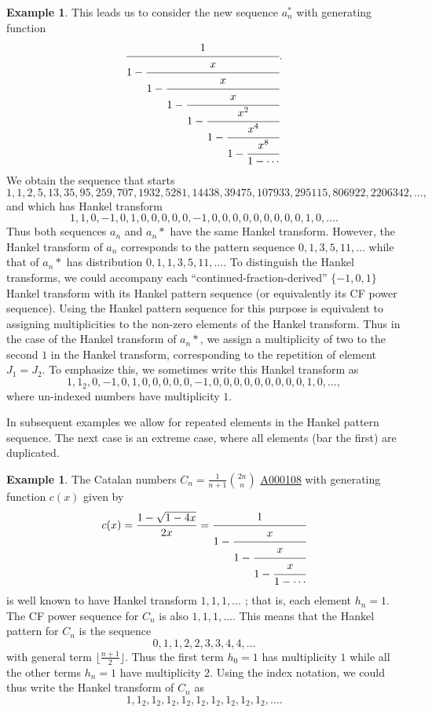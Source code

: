\documentclass[12pt,reqno]{article}
\theoremstyle{definition}
\newtheorem{example}[theorem]{Example}
\newcommand{\seqnum}[1]{\href{http://oeis.org/#1}{\underline{#1}}}
\begin{document}
\begin{example}
This leads us to consider the new sequence $a_n^*$ with generating function
$$\cfrac{1}{1-
\cfrac{x}{1-
\cfrac{x}{1-
\cfrac{x}{1-
\cfrac{x^2}{1-
\cfrac{x^4}{1-
\cfrac{x^8}{1-\cdots}}}}}}}.$$ We obtain the sequence that starts
$$1, 1, 2, 5, 13, 35, 95, 259, 707, 1932, 5281, 14438, 39475, 107933, 295115, 806922, 2206342, \ldots,$$ and which has Hankel transform
$$1, 1, 0, -1, 0, 1, 0, 0, 0, 0, 0, -1, 0, 0, 0, 0, 0, 0, 0, 0, 0, 1, 0,\ldots.$$
Thus both sequences $a_n$ and $a_n*$ have the same Hankel transform. However, the Hankel transform of $a_n$ corresponds to the
pattern sequence $0,1,3,5,11,\ldots$ while that of $a_n*$ has distribution $0,1,1,3,5,11,\ldots$. To distinguish the Hankel transforms, we could accompany each ``continued-fraction-derived'' $\{-1,0,1\}$ Hankel transform with its Hankel pattern sequence (or equivalently its CF power sequence). Using the Hankel pattern sequence for this purpose is equivalent to assigning multiplicities to the non-zero elements of the Hankel transform. Thus in the case of the Hankel transform of $a_n*$, we assign a multiplicity of two to the second $1$ in the Hankel transform, corresponding to the repetition of element $J_1=J_2$. To emphasize this, we sometimes write this Hankel transform as
$$1, 1_2, 0, -1, 0, 1, 0, 0, 0, 0, 0, -1, 0, 0, 0, 0, 0, 0, 0, 0, 0, 1, 0,\ldots, $$ where un-indexed numbers have multiplicity $1$.



\end{example}

In subsequent examples we allow for repeated elements in the Hankel pattern sequence. The next case is an extreme case, where all elements (bar the first) are duplicated.


\begin{example} The Catalan numbers $C_n=\frac{1}{n+1} \binom{2n}{n}$ \seqnum{A000108} with generating function $c(x)$ given by
$$c(x)=\frac{1-\sqrt{1-4x}}{2x}= \cfrac{1}{1-
\cfrac{x}{1-
\cfrac{x}{1-
\cfrac{x}{1-\cdots}}}}
$$ is well known to have Hankel transform $1,1,1,\ldots$ \cite{Kratt}; that is, each element $h_n=1$. The CF power sequence for $C_n$ is also $1,1,1,\ldots$. This means that the Hankel pattern for $C_n$ is the sequence $$0,1,1,2,2,3,3,4,4,\ldots$$ with general term $\lfloor \frac{n+1}{2} \rfloor$. Thus the first term $h_0=1$ has multiplicity $1$ while all the other terms $h_n=1$ have multiplicity $2$.
Using the index notation, we could thus write the Hankel transform of $C_n$ as
$$1,1_2,1_2,1_2,1_2,1_2,1_2,1_2,1_2,1_2,\ldots.$$
\end{example}
\end{document}
